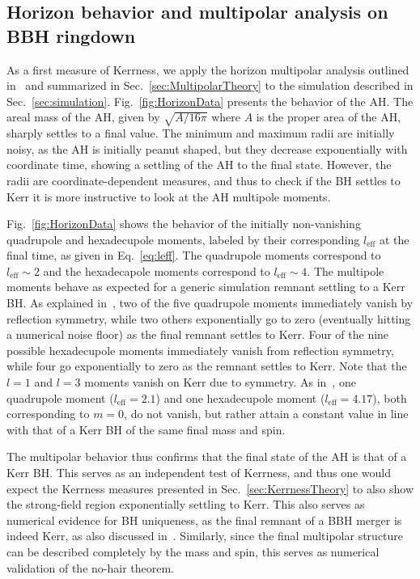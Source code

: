 \subsection{Horizon behavior and multipolar analysis on BBH ringdown}
\label{sec:MultipolarResults}

\HorizonDataFigure

As a first measure of Kerrness, we apply the horizon multipolar analysis outlined in~\cite{Owen:2009sb} and summarized in Sec.~\ref{sec:MultipolarTheory} to the simulation described in Sec.~\ref{sec:simulation}. Fig.~\ref{fig:HorizonData} presents the behavior of the AH. The areal mass of the AH, given by $\sqrt{A/16\pi}$ where $A$ is the proper area of the AH, sharply settles to a final value. The minimum and maximum radii are initially noisy, as the AH is initially peanut shaped, but they decrease exponentially with coordinate time, showing a settling of the AH to the final state. However, the radii are coordinate-dependent measures, and thus to check if the BH settles to Kerr it is more instructive to look at the AH multipole moments.

Fig.~\ref{fig:HorizonData} shows the behavior of the initially non-vanishing quadrupole and hexadecupole moments, labeled by their corresponding $l_\mathrm{eff}$ at the final time, as given in Eq.~\eqref{eq:leff}. The quadrupole moments correspond to $l_\mathrm{eff} \sim 2$ and the hexadecapole moments correspond to $l_\mathrm{eff}\sim 4$. The multipole moments behave as expected for a generic simulation remnant settling to a Kerr BH. As explained in~\cite{Owen:2009sb}, two of the five quadrupole moments immediately vanish by reflection symmetry, while two others exponentially go to zero (eventually hitting a numerical noise floor) as the final remnant settles to Kerr. Four of the nine possible hexadecupole moments immediately vanish from reflection symmetry, while four go exponentially to zero as the remnant settles to Kerr. Note that the $l = 1$ and $l = 3$ moments vanish on Kerr due to symmetry. As in~\cite{Owen:2009sb}, one quadrupole moment ($l_\mathrm{eff} = 2.1$) and one hexadecupole moment ($l_\mathrm{eff} = 4.17$), both corresponding to $m = 0$, do not vanish, but rather attain a constant value in line with that of a Kerr BH of the same final mass and spin.

The multipolar behavior thus confirms that the final state of the AH is that of a Kerr BH. This serves as an independent test of Kerrness, and thus one would expect the Kerrness measures presented in Sec.~\ref{sec:KerrnessTheory} to also show the strong-field region exponentially settling to Kerr. This also serves as numerical evidence for BH uniqueness, as the final remnant of a BBH merger is indeed Kerr, as also discussed in~\cite{Owen:2009sb}. Similarly, since the final multipolar structure can be described completely by the mass and spin, this serves as numerical validation of the no-hair theorem. 

